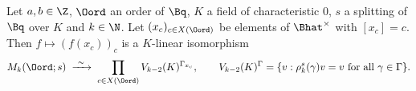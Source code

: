 Let $a,b\in\Z$, $\Oord$ an order of $\Bq$, $K$ a field of characteristic $0$, $s$ a splitting of $\Bq$ over $K$ and $k\in\N$. Let
$(x_c)_{c\in X(\Oord)}$ be elements of $\Bhat^\times$ with $[x_c]=c$. Then $f\mapsto(f(x_c))_c$ is a $K$-linear isomorphism
\[
  M_k(\Oord;s)\;\xrightarrow{\ \sim\ }\;\prod_{c\in X(\Oord)}V_{k-2}(K)^{\Gamma_{x_c}},\qquad
  V_{k-2}(K)^{\Gamma}=\{v:\rho_k^s(\gamma)v=v\text{ for all }\gamma\in\Gamma\}.
\]
